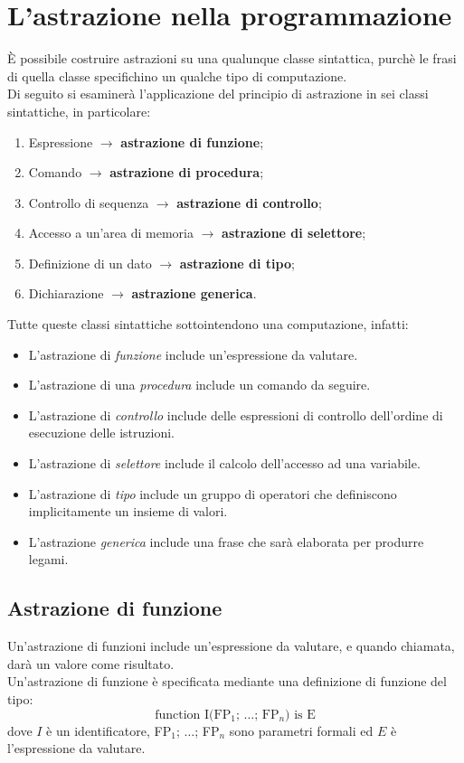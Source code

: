 \documentclass[12pt]{report}
\begin{document}
 	\chapter{L'astrazione nella programmazione}
 	È possibile costruire astrazioni su una qualunque classe sintattica, purchè le frasi di quella classe specifichino un qualche tipo di computazione. \\
 	Di seguito si esaminerà l'applicazione del principio di astrazione in sei classi sintattiche, in particolare:
 	\begin{enumerate}
 		\item Espressione $\rightarrow$ \textbf{astrazione di funzione};
 		\item Comando $\rightarrow$ \textbf{astrazione di procedura};
 		\item Controllo di sequenza $\rightarrow$ \textbf{astrazione di controllo};
 		\item Accesso a un'area di memoria $\rightarrow$ \textbf{astrazione di selettore};
 		\item Definizione di un dato $\rightarrow$ \textbf{astrazione di tipo};
 		\item Dichiarazione $\rightarrow$ \textbf{astrazione generica}.
 	\end{enumerate}
 	Tutte queste classi sintattiche sottointendono una computazione, infatti:
 	\begin{itemize}
 		\item L'astrazione di \textit{funzione} include un'espressione da valutare.
 		\item L'astrazione di una \textit{procedura} include un comando da seguire.
 		\item L'astrazione di \textit{controllo} include delle espressioni di controllo dell'ordine di esecuzione delle istruzioni.
 		\item L'astrazione di \textit{selettore} include il calcolo dell'accesso ad una variabile.
 		\item L'astrazione di \textit{tipo} include un gruppo di operatori che definiscono implicitamente un insieme di valori.
 		\item L'astrazione \textit{generica} include una frase che sarà elaborata per produrre legami.
 	\end{itemize}
 	\section{Astrazione di funzione}
 	Un'astrazione di funzioni include un'espressione da valutare, e quando chiamata, darà un valore come risultato. \\
 	Un'astrazione di funzione è specificata mediante una definizione di funzione del tipo:
 	\[
 	\text{function I(FP$_1$; $\dots$; FP$_n$) is E}
 	\]
 	dove $I$ è un identificatore, FP$_1$; $\dots$; FP$_n$ sono parametri formali ed $E$ è l'espressione da valutare.
\end{document}

